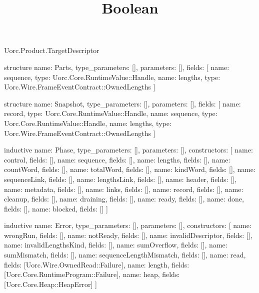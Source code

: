 \begin{lexlean}{Uorc.Product.TargetDescriptor}
\title{Boolean}
\begin{semanticmodule}
structure{
  name: Parts,
  type_parameters: [],
  parameters: [],
  fields: [
    {name: sequence, type: Uorc.Core.RuntimeValue::Handle},
    {name: lengths, type: Uorc.Wire.FrameEventContract::OwnedLengths}
  ]
}

structure{
  name: Snapshot,
  type_parameters: [],
  parameters: [],
  fields: [
    {name: record, type: Uorc.Core.RuntimeValue::Handle},
    {name: sequence, type: Uorc.Core.RuntimeValue::Handle},
    {name: lengths, type: Uorc.Wire.FrameEventContract::OwnedLengths}
  ]
}

inductive{
  name: Phase,
  type_parameters: [],
  parameters: [],
  constructors: [
    {name: control, fields: []},
    {name: sequence, fields: []},
    {name: lengths, fields: []},
    {name: countWord, fields: []},
    {name: totalWord, fields: []},
    {name: kindWord, fields: []},
    {name: sequenceLink, fields: []},
    {name: lengthsLink, fields: []},
    {name: header, fields: []},
    {name: metadata, fields: []},
    {name: links, fields: []},
    {name: record, fields: []},
    {name: cleanup, fields: []},
    {name: draining, fields: []},
    {name: ready, fields: []},
    {name: done, fields: []},
    {name: blocked, fields: []}
  ]
}

inductive{
  name: Error,
  type_parameters: [],
  parameters: [],
  constructors: [
    {name: wrongRun, fields: []},
    {name: notReady, fields: []},
    {name: invalidDescriptor, fields: []},
    {name: invalidLengthsKind, fields: []},
    {name: sumOverflow, fields: []},
    {name: sumMismatch, fields: []},
    {name: sequenceLengthMismatch, fields: []},
    {name: read, fields: [Uorc.Wire.OwnedRead::Failure]},
    {name: length, fields: [Uorc.Core.RuntimeProgram::Failure]},
    {name: heap, fields: [Uorc.Core.Heap::HeapError]}
  ]
}


\end{semanticmodule}
\end{lexlean}
